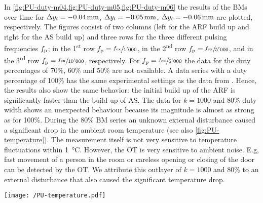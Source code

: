 In \cref{fig:PU-duty-m04,fig:PU-duty-m05,fig:PU-duty-m06} the results of the BMs over 
time for $\Dy_{i}=\SI{-0.04}{\mm}$, $\Dy_{i}=\SI{-0.05}{\mm}$, 
$\Dy_{i}=\SI{-0.06}{\mm}$ are plotted, respectively. The figures consist of two 
columns (left for the ARF build up and right for the AS build up) and three 
rows for the three different pulsing frequencies $f_{\mathrm{p}}$; in the 
1\textsuperscript{st} row $f_{\mathrm{p}}=\sfrac{f_{\mathrm{ex}}}{1'000}$, in the 
2\textsuperscript{nd} row $f_{\mathrm{p}}=\sfrac{f_{\mathrm{ex}}}{5'000}$, and in the 
3\textsuperscript{rd} row $f_{\mathrm{p}}=\sfrac{f_{\mathrm{ex}}}{10'000}$, respectively. For 
$f_{\mathrm{p}}=\sfrac{f_{\mathrm{ex}}}{5'000}$ the data for the duty percentages of 70\%, 60\% and 
50\% are not available. A data series with a duty percentage of 100\% has the 
same experimental settings as the data from \cite{Goering2021}. Hence, the 
results also show the same behavior: the initial build up of the ARF is 
significantly faster than the build up of AS. The data for $k=1000$ and 80\% 
duty width shows an unexpected behaviour because its magnitude is almost as 
strong as for 100\%.  During the 80\% BM series an unknown external disturbance 
caused a significant drop in the ambient room temperature (see also 
\cref{fig:PU-temperature}). The measurement itself is not very sensitive to 
temperature fluctuations within \SI{1}{\degreeCelsius}.  However, the OT is 
very sensitive to ambient noise.  E.g, fast movement of a person in the room or 
careless opening or closing of the door can be detected by the OT.  We 
attribute this outlayer of $k=1000$ and 80\% to an external disturbance that 
also caused the significant temperature drop.

\begin{figure*}[tbp]
  \centering
  \texttt{[image: /PU-temperature.pdf]}
  \caption{Ambient temperature $T$ at device for $k = 1000$ BM series over 
  time.  The experiment of 80\% occurred between 14:00 and 15:00 (gray shaded 
area).}\label{fig:PU-temperature}
\end{figure*}

